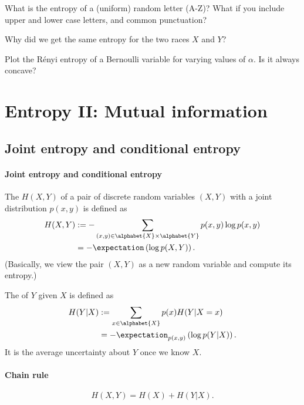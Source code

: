 \documentclass[a4paper, 11pt, openany]{book}
\begin{document}
\begin{exercise}
What is the entropy of a (uniform) random letter (A-Z)? What if you include upper and lower case letters, and common punctuation?
\end{exercise}


\begin{exercise}
Why did we get the same entropy for the two races $X$ and $Y$?
\end{exercise}


\begin{exercise}
Plot the R\'enyi entropy of a Bernoulli variable for varying values of $\alpha$. Is it always concave?
\end{exercise}


\section{Entropy II: Mutual information}
\label{sec:32}




\subsection{Joint entropy and conditional entropy}

\paragraph{Joint entropy and conditional entropy}


The  $H(X,Y)$ of a pair of discrete random variables $(X,Y)$ with a joint distribution $p(x,y)$ is defined as
\begin{align*}
	H(X,Y) &:= - \sum_{(x,y) \in \alphabet{X} \times \alphabet{Y}} p(x,y) \log p(x,y)\\
	&= -\expectation \left( \log p(X,Y) \right).
\end{align*}
(Basically, we view the pair $(X,Y)$ as a new random variable and compute its entropy.)

The  of $Y$ given $X$ is defined as
\begin{align*}
	H(Y|X) &:= \sum_{x \in \alphabet{X}} p(x) H(Y|X=x)\\
	&= -\expectation_{p(x,y)} \left( \log p(Y|X) \right).
\end{align*}
It is the average uncertainty about $Y$ once we know $X$.


\paragraph{Chain rule}
\begin{theorem}
\[
	H(X,Y) = H(X) + H(Y|X).
\]
\end{theorem}
\end{document}
